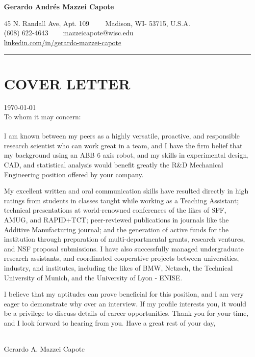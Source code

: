 \documentclass[12pt,letterpaper]{article}
\begin{document}
\begin{center}
	{\LARGE \textbf{Gerardo Andrés Mazzei Capote}}

	45 N. Randall Ave, Apt. 109\ \ \textbullet
	\ \ Madison, WI- 53715, U.S.A.
	\\
	(608) 622-4643 \ \textbullet
	\ \ mazzeicapote@wisc.edu\\
	\href{https://www.linkedin.com/in/gerardo-mazzei-capote}{linkedin.com/in/gerardo-mazzei-capote}
	
\end{center}
\vspace{-0.5em}
\hrule
\vspace{0.4em}
\vspace{-1em}

\section*{COVER LETTER}
\vspace{0.4em}
\today
\\
To whom it may concern:
\\
\\
I am known between my peers as a highly versatile, proactive, and responsible research scientist who can work great in a team, and I have the firm belief that my background using an ABB 6 axis robot, and my skills in experimental design, CAD, and statistical analysis would benefit greatly the R\&D Mechanical Engineering position offered by your company.

My excellent written and oral communication skills have resulted directly in high ratings from students in classes taught while working as a Teaching Assistant; technical presentations at world-renowned conferences of the likes of SFF, AMUG, and RAPID+TCT; peer-reviewed publications in journals like the Additive Manufacturing journal; and the generation of active funds for the institution through preparation of multi-departmental grants, research ventures, and NSF proposal submissions. I have also successfully managed undergraduate research assistants, and coordinated cooperative projects between universities, industry, and institutes, including the likes of BMW, Netzsch, the Technical University of Munich, and the University of Lyon - ENISE.

I believe that my aptitudes can prove beneficial for this position, and I am very eager to demonstrate why over an interview. If my profile interests you, it would be a privilege to discuss details of career opportunities. Thank you for your time, and I look forward to hearing from you. Have a great rest of your day,
\\
\\
\begin{center}
Gerardo A. Mazzei Capote
\end{center}
\end{document}
